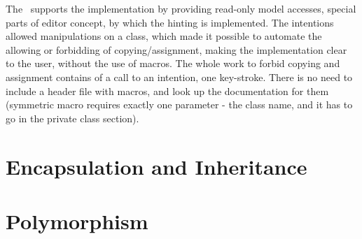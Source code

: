 The \jbmps\ supports the implementation by providing read-only model accesses, special parts of editor concept, 
by which the hinting is implemented. The intentions allowed manipulations on a class, which made it possible to 
automate the allowing or forbidding of copying/assignment, making the implementation clear to the user, without the 
use of macros. The whole work to forbid copying and assignment contains of a call to an intention, one key-stroke.
There is no need to include a header file with macros, and look up the documentation for them (symmetric macro requires
exactly one parameter - the class name, and it has to go in the private class section).














\section{Encapsulation and Inheritance}

\section{Polymorphism}

